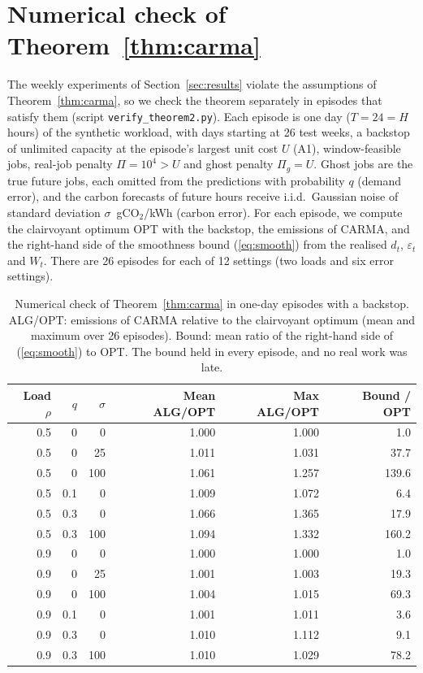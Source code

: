 \section{Numerical check of Theorem~\ref{thm:carma}}\label{app:thm2check}

The weekly experiments of Section~\ref{sec:results} violate the assumptions of Theorem~\ref{thm:carma}, so we check the theorem separately in episodes that satisfy them (script \texttt{verify\_theorem2.py}). Each episode is one day ($T=24=H$ hours) of the synthetic workload, with days starting at 26 test weeks, a backstop of unlimited capacity at the episode's largest unit cost $U$ (A1), window-feasible jobs, real-job penalty $\Pi=10^4>U$ and ghost penalty $\Pi_g=U$. Ghost jobs are the true future jobs, each omitted from the predictions with probability $q$ (demand error), and the carbon forecasts of future hours receive i.i.d.\ Gaussian noise of standard deviation $\sigma$~gCO$_2$/kWh (carbon error). For each episode, we compute the clairvoyant optimum OPT with the backstop, the emissions of CARMA, and the right-hand side of the smoothness bound (\ref{eq:smooth}) from the realised $d_t$, $\varepsilon_t$ and $W_t$. There are 26 episodes for each of 12 settings (two loads and six error settings).

\begin{table}[!htbp]
\centering
\caption{Numerical check of Theorem~\ref{thm:carma} in one-day episodes with a backstop. ALG/OPT: emissions of CARMA relative to the clairvoyant optimum (mean and maximum over 26 episodes). Bound: mean ratio of the right-hand side of (\ref{eq:smooth}) to OPT. The bound held in every episode, and no real work was late.}
\label{tab:thm2}
\small
\begin{tabular}{rrrrrr}
\toprule
Load $\rho$ & $q$ & $\sigma$ & Mean ALG/OPT & Max ALG/OPT & Bound / OPT \\
\midrule
0.5 & 0 & 0 & 1.000 & 1.000 & 1.0 \\
0.5 & 0 & 25 & 1.011 & 1.031 & 37.7 \\
0.5 & 0 & 100 & 1.061 & 1.257 & 139.6 \\
0.5 & 0.1 & 0 & 1.009 & 1.072 & 6.4 \\
0.5 & 0.3 & 0 & 1.066 & 1.365 & 17.9 \\
0.5 & 0.3 & 100 & 1.094 & 1.332 & 160.2 \\
0.9 & 0 & 0 & 1.000 & 1.000 & 1.0 \\
0.9 & 0 & 25 & 1.001 & 1.003 & 19.3 \\
0.9 & 0 & 100 & 1.004 & 1.015 & 69.3 \\
0.9 & 0.1 & 0 & 1.001 & 1.011 & 3.6 \\
0.9 & 0.3 & 0 & 1.010 & 1.112 & 9.1 \\
0.9 & 0.3 & 100 & 1.010 & 1.029 & 78.2 \\
\bottomrule
\end{tabular}
\end{table}

